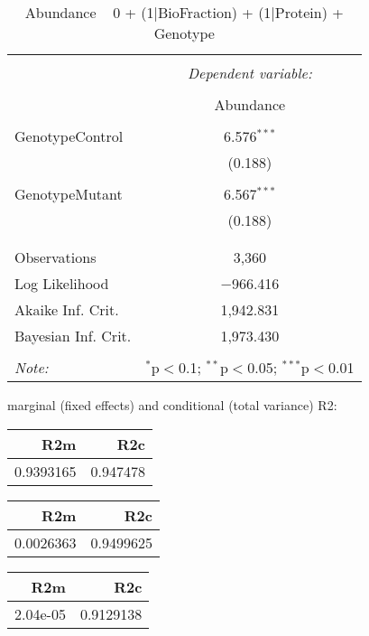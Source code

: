 \documentclass[11pt]{report}
\begin{document}
\begin{table}[!htbp] \centering 
  \caption{Abundance ~ 0 + (1|BioFraction) + (1|Protein) + Genotype} 
  \label{} 
\begin{tabular}{@{\extracolsep{5pt}}lc} 
\\[-1.8ex]\hline 
\hline \\[-1.8ex] 
 & \multicolumn{1}{c}{\textit{Dependent variable:}} \\ 
\cline{2-2} 
\\[-1.8ex] & Abundance \\ 
\hline \\[-1.8ex] 
 GenotypeControl & 6.576$^{***}$ \\ 
  & (0.188) \\ 
  & \\ 
 GenotypeMutant & 6.567$^{***}$ \\ 
  & (0.188) \\ 
  & \\ 
\hline \\[-1.8ex] 
Observations & 3,360 \\ 
Log Likelihood & $-$966.416 \\ 
Akaike Inf. Crit. & 1,942.831 \\ 
Bayesian Inf. Crit. & 1,973.430 \\ 
\hline 
\hline \\[-1.8ex] 
\textit{Note:}  & \multicolumn{1}{r}{$^{*}$p$<$0.1; $^{**}$p$<$0.05; $^{***}$p$<$0.01} \\ 
\end{tabular} 
\end{table} 
marginal (fixed effects) and conditional (total variance) R2:

\begin{tabular}{r|r}
\hline
R2m & R2c\\
\hline
0.9393165 & 0.947478\\
\hline
\end{tabular}

\begin{tabular}{r|r}
\hline
R2m & R2c\\
\hline
0.0026363 & 0.9499625\\
\hline
\end{tabular}

\begin{tabular}{r|r}
\hline
R2m & R2c\\
\hline
2.04e-05 & 0.9129138\\
\hline
\end{tabular}
\end{document}
